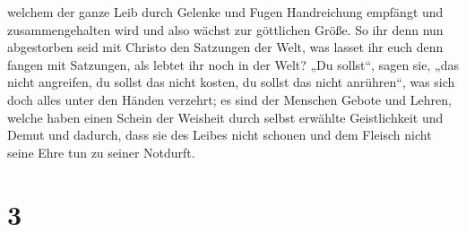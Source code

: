 welchem der ganze Leib durch Gelenke und Fugen Handreichung empfängt und
zusammengehalten wird und also wächst zur göttlichen Größe.
 So ihr denn nun abgestorben seid mit Christo den
Satzungen der Welt, was lasset ihr euch denn fangen mit Satzungen, als
lebtet ihr noch in der Welt?  „Du sollst``, sagen sie,
„das nicht angreifen, du sollst das nicht kosten, du sollst das nicht
anrühren``,  was sich doch alles unter den Händen
verzehrt; es sind der Menschen Gebote und Lehren,  welche
haben einen Schein der Weisheit durch selbst erwählte Geistlichkeit und
Demut und dadurch, dass sie des Leibes nicht schonen und dem Fleisch
nicht seine Ehre tun zu seiner Notdurft.

\hypertarget{section-2}{%
\section{3}\label{section-2}}

